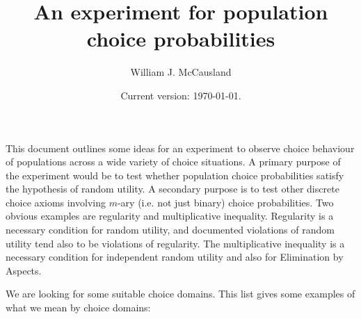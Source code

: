 \documentclass[11pt,letter]{amsart}
\begin{document}
\title{An experiment for population choice probabilities}
\author{William J. McCausland}
\date{Current version: \today.}

\maketitle

This document outlines some ideas for an experiment to observe choice behaviour of populations across a wide variety of choice situations.
A primary purpose of the experiment would be to test whether population choice probabilities satisfy the hypothesis of random utility.
A secondary purpose is to test other discrete choice axioms involving $m$-ary (i.e. not just binary) choice probabilities.
Two obvious examples are regularity and  multiplicative inequality.
Regularity is a necessary condition for random utility, and documented violations of random utility tend also to be violations of regularity.
The multiplicative inequality is a necessary condition for independent random utility and also for Elimination by Aspects.

We are looking for some suitable choice domains.
This list gives some examples of what we mean by choice domains:
\end{document}
